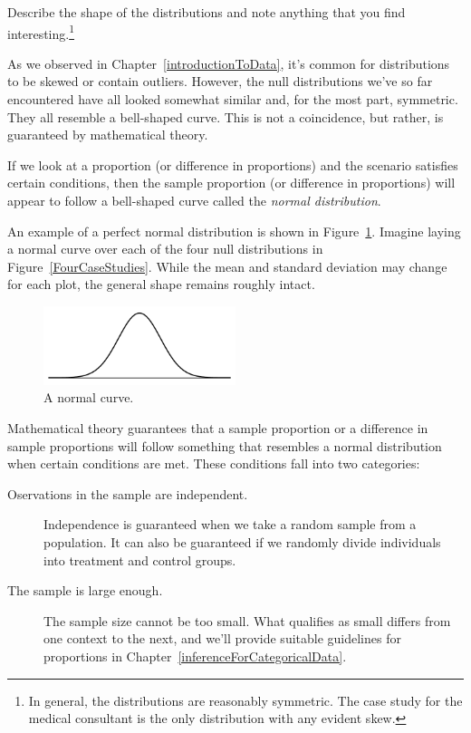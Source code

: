 \begin{exercise}
Describe the shape of the distributions and note anything that you find interesting.\footnote{In general, the distributions are reasonably symmetric. The case study for the medical consultant is the only distribution with any evident skew.}
\end{exercise}

As we observed in Chapter~\ref{introductionToData}, it's common for distributions to be skewed or contain outliers. However, the null distributions we've so far encountered have all looked somewhat similar and, for the most part, symmetric. They all resemble a bell-shaped curve. This is not a coincidence, but rather, is guaranteed by  mathematical theory.

\begin{termBox}{
If we look at a proportion (or difference in proportions) and the scenario satisfies certain conditions, then the sample proportion (or difference in proportions) will appear to follow a bell-shaped curve called the \emph{normal distribution}.}
\end{termBox}

An example of a perfect normal distribution is shown in Figure~\ref{simpleNormal}. Imagine laying a normal curve over each of the four null distributions in Figure~\ref{FourCaseStudies}. While the mean and standard deviation may change for each plot, the general shape remains roughly intact.

\begin{figure}[ht]
\centering
\includegraphics[width=0.5\textwidth]{02/figures/simpleNormal/simpleNormal}
\caption{A normal curve.}
\label{simpleNormal}
\end{figure}

Mathematical theory guarantees that a sample proportion or a difference in sample proportions will follow something that resembles a normal distribution when certain conditions are met. These conditions fall into two categories:
\begin{description}
\item[Oservations in the sample are independent.] Independence is guaranteed when we take a random sample from a population. It can also be guaranteed if we randomly divide individuals into treatment and control groups.
\item[The sample is large enough.] The sample size cannot be too small. What qualifies as small differs from one context to the next, and we'll provide suitable guidelines for proportions in Chapter~\ref{inferenceForCategoricalData}.
\end{description}

